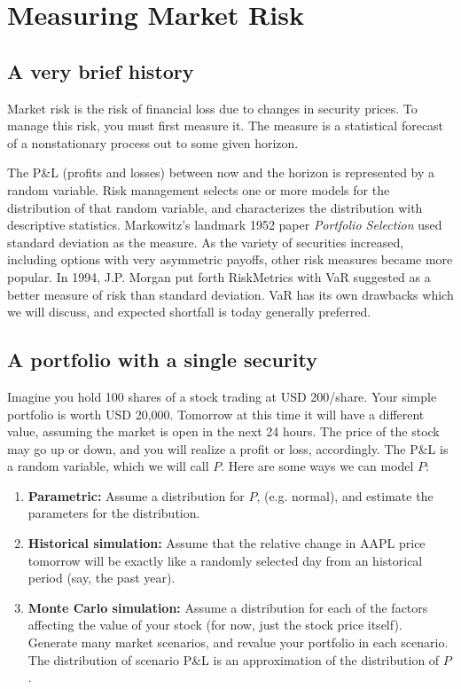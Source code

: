 \documentclass{report}
\numberwithin{problem}{chapter} %
\newcommand{\pnl}{P\&L }
\begin{document}
\chapter{Measuring Market Risk}

\section{A very brief history}
Market risk is the risk of financial loss due to changes in security prices. To manage this risk, you must first measure it. The measure is a statistical forecast of a nonstationary process out to some given horizon. 

The \pnl (profits and losses) between now and the horizon is represented by a random variable. Risk management selects one or more models for the distribution of that random variable, and characterizes the distribution with descriptive statistics. Markowitz's landmark 1952 paper {\it Portfolio Selection} used standard deviation as the measure. As the variety of securities increased, including options with very asymmetric payoffs, other risk measures became more popular. In 1994, J.P. Morgan put forth RiskMetrics with VaR suggested as a better measure of risk than standard deviation. VaR has its own drawbacks which we will discuss, and expected shortfall is today generally preferred.  

\section{A portfolio with a single security}
Imagine you hold 100 shares of a stock trading at USD 200/share. Your simple portfolio is worth USD 20,000. Tomorrow at this time it will have a different value, assuming the market is open in the next 24 hours. The price of the stock may go up or down, and you will realize a profit or loss, accordingly. The \pnl is a random variable, which we will call $P$. Here are some ways we can model $P$:
\begin{enumerate}
\item{{\bf Parametric:} Assume a distribution for $P$, (e.g. normal), and estimate the parameters for the distribution. }
\item{{\bf Historical simulation:} Assume that the relative change in AAPL price tomorrow will be exactly like a randomly selected day from an historical period (say, the past year). }
\item{{\bf Monte Carlo simulation:} Assume a distribution for each of the factors affecting the value of your stock (for now, just the stock price itself). Generate many market scenarios, and revalue your portfolio in each scenario. The distribution of scenario \pnl is an approximation of  the distribution of $P$.}
\end{enumerate}
\end{document}
